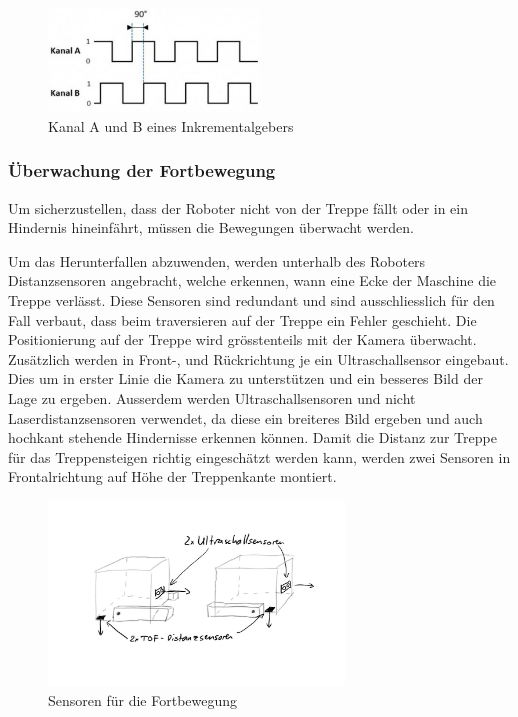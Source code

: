 \begin{figure}[H]
  \includegraphics[width=0.5\textwidth]{img/Fortbewegung/Increment Encoder Signal.png}
  \centering
  \caption{Kanal A und B eines Inkrementalgebers}
  \label{fig4}
\end{figure}


\subsubsection{Überwachung der Fortbewegung}
Um sicherzustellen, dass der Roboter nicht von der Treppe fällt oder in ein Hindernis hineinfährt, müssen die Bewegungen überwacht werden.

Um das Herunterfallen abzuwenden, werden unterhalb des Roboters Distanzsensoren angebracht, welche erkennen, wann eine Ecke der Maschine die Treppe verlässt. Diese Sensoren sind redundant und sind ausschliesslich für den Fall verbaut, dass beim traversieren auf der Treppe ein Fehler geschieht.
Die Positionierung auf der Treppe wird grösstenteils mit der Kamera überwacht. Zusätzlich werden in Front-, und Rückrichtung je ein Ultraschallsensor eingebaut. Dies um in erster Linie die Kamera zu unterstützen und ein besseres Bild der Lage zu ergeben. Ausserdem werden Ultraschallsensoren und nicht Laserdistanzsensoren verwendet, da diese ein breiteres Bild ergeben und auch hochkant stehende Hindernisse erkennen können.
Damit die Distanz zur Treppe für das Treppensteigen richtig eingeschätzt werden kann, werden zwei Sensoren in Frontalrichtung auf Höhe der Treppenkante montiert.

\begin{figure}[h]
  \includegraphics[width=0.7\textwidth]{img/Fortbewegung/Skizze_Sensoren_Fortbewegung_1.png}
  \centering
  \caption{Sensoren für die Fortbewegung}
  \label{fig5}
\end{figure}



